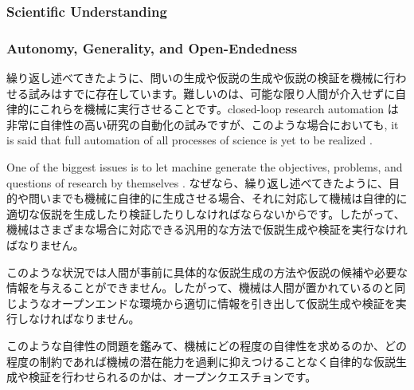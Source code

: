 \subsubsection{Scientific Understanding}

\subsubsection{Autonomy, Generality, and Open-Endedness}
繰り返し述べてきたように、問いの生成や仮説の生成や仮説の検証を機械に行わせる試みはすでに存在しています。難しいのは、可能な限り人間が介入せずに自律的にこれらを機械に実行させることです。closed-loop research automation は非常に自律性の高い研究の自動化の試みですが、このような場合においても,  it is said that full automation of all processes of science is yet to be realized \cite{zenil2023,coley2020autonomous,coley2020autonomousII}. 

One of the biggest issues is to let machine generate the objectives, problems, and questions of research by themselves \cite{coley2020autonomousII}. なぜなら、繰り返し述べてきたように、目的や問いまでも機械に自律的に生成させる場合、それに対応して機械は自律的に適切な仮説を生成したり検証したりしなければならないからです。したがって、機械はさまざまな場合に対応できる汎用的な方法で仮説生成や検証を実行なければなりません。

このような状況では人間が事前に具体的な仮説生成の方法や仮説の候補や必要な情報を与えることができません。したがって、機械は人間が置かれているのと同じようなオープンエンドな環境から適切に情報を引き出して仮説生成や検証を実行しなければなりません。

このような自律性の問題を鑑みて、機械にどの程度の自律性を求めるのか、どの程度の制約であれば機械の潜在能力を過剰に抑えつけることなく自律的な仮説生成や検証を行わせられるのかは、オープンクエスチョンです。


